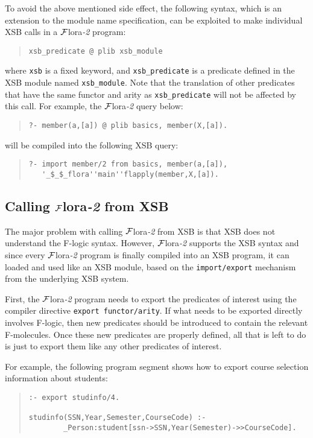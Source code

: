 \documentclass[11pt]{article}
\newcommand{\FLORA}{{\mbox{${\cal F}${\sc lora}\rm\emph{-2}}}\xspace}
\newcommand{\fl}{\mbox{F-logic}\xspace}
\begin{document}
To avoid the above mentioned side effect, the following syntax, which
is an extension to the module name specification, can be exploited to
make individual XSB calls in a \FLORA program:
\begin{quote}
\begin{verbatim}
xsb_predicate @ plib xsb_module
\end{verbatim}
\end{quote}
where {\tt xsb} is a fixed keyword, and \verb|xsb_predicate| is a
predicate defined in the XSB module named \verb|xsb_module|. Note that
the translation of other predicates that have the same functor and
arity as \verb|xsb_predicate| will not be affected by this call. For
example, the \FLORA query below:
\begin{quote}
\verb|?- member(a,[a]) @ plib basics, member(X,[a]).|
\end{quote}
will be compiled into the following XSB query:
\begin{quote}
\begin{verbatim}
?- import member/2 from basics, member(a,[a]),
   '_$_$_flora''main''flapply(member,X,[a]).
\end{verbatim}
\end{quote}


\subsection{Calling \FLORA from XSB}


%
The major problem with calling \FLORA from XSB is that XSB does not
understand the \fl syntax. However, \FLORA supports the XSB syntax and
since every \FLORA program is finally compiled into an XSB program, it
can loaded and used like an XSB module, based on the
{\tt import/export} mechanism from the underlying XSB system.

First, the \FLORA program needs to export the predicates of interest
using the compiler directive \verb|export functor/arity|. If what
needs to be exported directly involves \fl, then new predicates should
be introduced to contain the relevant F-molecules. Once these new
predicates are properly defined, all that is left to do is just to
export them like any other predicates of interest.

For example, the following program segment shows how to export course
selection information about students:
\begin{quote}
\begin{verbatim}
:- export studinfo/4.

studinfo(SSN,Year,Semester,CourseCode) :-
        _Person:student[ssn->SSN,Year(Semester)->>CourseCode].
\end{verbatim}
\end{quote}
\end{document}
